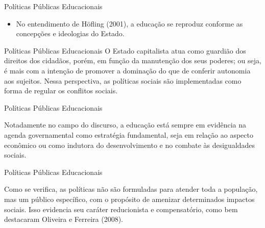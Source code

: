 \documentclass[12pt]{beamer}
\begin{document}
			\begin{frame}{Políticas Públicas Educacionais}
				\justifying
				\begin{itemize}
					
					\item No entendimento de Höfling (2001), a educação se reproduz conforme as concepções e ideologias do Estado.
					
					
				\end{itemize}
			\end{frame}
			
			\begin{frame}{Políticas Públicas Educacionais}
				\justifying
				O Estado capitalista atua como guardião dos direitos dos cidadãos,
				porém, em função da manutenção dos seus poderes; ou seja, é mais com a
				intenção de promover a dominação do que de conferir autonomia aos sujeitos.
				Nessa perspectiva, as políticas sociais são implementadas como forma de regular
				os conflitos sociais.
			\end{frame}
			
			\begin{frame}{Políticas Públicas Educacionais}
				\justifying
				
				Notadamente no campo do discurso, a educação está sempre em
				evidência na agenda governamental como estratégia fundamental, seja em relação
				ao aspecto econômico ou como indutora do desenvolvimento e no combate
				às desigualdades sociais.
			\end{frame}
			
			\begin{frame}{Políticas Públicas Educacionais}
				\justifying
				
				Como se verifica, as políticas não são formuladas para atender toda a
				população, mas um público específico, com o propósito de amenizar determinados
				impactos sociais. Isso evidencia seu caráter reducionista e compensatório, como
				bem destacaram Oliveira e Ferreira (2008).
			\end{frame}
			
\end{document}
